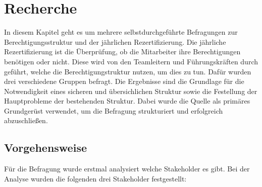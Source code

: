 \chapter{Recherche}
\label{ch:Recherche}
In diesem Kapitel geht es um mehrere selbstdurchgeführte Befragungen zur Berechtigungsstruktur und der jährlichen Rezertifizierung.
Die jährliche Rezertifizierung ist die Überprüfung, ob die Mitarbeiter ihre Berechtigungen benötigen oder nicht.
Diese wird von den Teamleitern und Führungskräften durch geführt, welche die Berechtigungstruktur nutzen, um dies zu tun.
Dafür wurden drei verschiedene Gruppen befragt.
Die Ergebnisse sind die Grundlage für die Notwendigkeit eines sicheren und übersichlichen Struktur sowie die Festellung der Hauptprobleme der bestehenden Struktur.
Dabei wurde die Quelle \cite{HowSurvey} als primäres Grundgerüst verwendet, um die Befragung strukturiert und erfolgreich abzuschließen.

\section{Vorgehensweise}
\label{sec:Vorgehensweise}
Für die Befragung wurde erstmal analysiert welche Stakeholder es gibt.
Bei der Analyse wurden die folgenden drei Stakeholder festgestellt:

